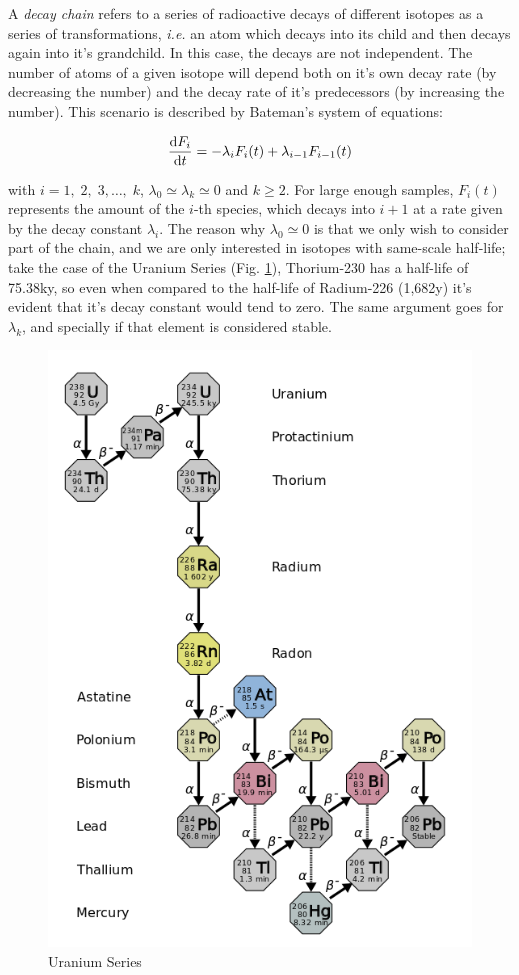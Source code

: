 \documentclass{article}
\theoremstyle{definition}
\theoremstyle{remark}
\begin{document}
A \textit{decay chain} refers to a series of radioactive decays of different isotopes as a series of transformations, \textit{i.e.} an atom which decays into its child and then decays again into it's grandchild. In this case, the decays are not independent. The number of atoms of a given isotope will depend both on it's own decay rate (by decreasing the number) and the decay rate of it's predecessors (by increasing the number). This scenario is described by Bateman's system of equations:

\begin{equation}
	\dv{F_{i}}{t}=-\lambda_{i}F_{i}(t)+\lambda_{i-1}F_{i-1}(t)
\end{equation}

with $i=1,\; 2,\; 3, \dots, \; k$, $\lambda_{0}\simeq\lambda_{k}\simeq0$ and $k \geq2$. For large enough samples, $F_{i}(t)$ represents the amount of the $i$-th species, which decays into $i+1$ at a rate given by the decay constant $\lambda_{i}$. The reason why $\lambda_{0}\simeq0$ is that we only wish to consider part of the chain, and we are only interested in isotopes with same-scale half-life; take the case of the Uranium Series (Fig. \ref{fig:uranium_series}), Thorium-230 has a half-life of 75.38\unit{\kilo y}, so even when compared to the half-life of Radium-226 (1,682\unit{y}) it's evident that it's decay constant would tend to zero. The same argument goes for $\lambda_{k}$, and specially if that element is considered stable.

\begin{figure}[htb!]
	\centering
	\includegraphics[width=0.5\linewidth]{decay_chain.png}
	\caption{Uranium Series}
	\label{fig:uranium_series}
\end{figure}
\end{document}
